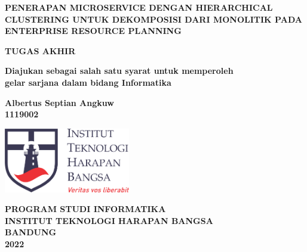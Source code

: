 \begin{titlepage}
	\begin{center}
		\vspace*{0cm}
		
		{\large \bfseries PENERAPAN MICROSERVICE DENGAN HIERARCHICAL CLUSTERING UNTUK DEKOMPOSISI DARI MONOLITIK PADA ENTERPRISE RESOURCE PLANNING }
			
		\vspace{3cm}
		
	 	{\large \bfseries TUGAS AKHIR}
	 	
	 	\vspace{1cm}
	 	{ \bfseries Diajukan sebagai salah satu syarat untuk memperoleh \\
	 				gelar sarjana dalam bidang Informatika }
 		

		\vspace{1cm}
		
		{ \bfseries Albertus Septian Angkuw \\ 1119002 }
		
	
		\vspace*{\fill} 
		
		\includegraphics[width=5.5cm]{img/ithb.png}
	
		\vspace{2.5cm}

		{\large \bfseries PROGRAM STUDI INFORMATIKA \\
		INSTITUT TEKNOLOGI HARAPAN BANGSA \\
		BANDUNG\\
		2022}
		
		\vspace{1cm}
	\end{center}
\end{titlepage}